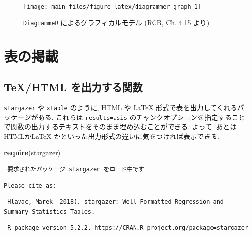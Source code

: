 \documentclass[
  nomag]{bxjsbook}
\newenvironment{Shaded}{\begin{snugshade}}{\end{snugshade}}
\newcommand{\KeywordTok}[1]{\textcolor[rgb]{0.13,0.29,0.53}{\textbf{#1}}}
\newcommand{\NormalTok}[1]{#1}
\theoremstyle{definition}
\theoremstyle{definition}
\theoremstyle{definition}
\theoremstyle{remark}
\begin{document}
\begin{figure}

{\centering \texttt{[image: main\_files/figure-latex/diagrammer-graph-1]} 

}

\caption{\texttt{DiagrammeR} によるグラフィカルモデル (RCB,
Ch. 4.15 より)}\label{fig:diagrammer-graph}
\end{figure}

\hypertarget{ux8868ux306eux63b2ux8f09}{%
\chapter{表の掲載}\label{ux8868ux306eux63b2ux8f09}}

\hypertarget{texhtml-ux3092ux51faux529bux3059ux308bux95a2ux6570}{%
\section{TeX/HTML
を出力する関数}\label{texhtml-ux3092ux51faux529bux3059ux308bux95a2ux6570}}

\texttt{stargazer} や \texttt{xtable} のように, HTML や \LaTeX
形式で表を出力してくれるパッケージがある. これらは
\texttt{results=\textquotesingle{}asis\textquotesingle{}}
のチャンクオプションを指定することで関数の出力するテキストをそのまま埋め込むことができる.
よって, あとは HTMLか\LaTeX
かといった出力形式の違いに気をつければ表示できる.



\begin{Shaded}
\begin{Highlighting}[numbers=left,,]
\KeywordTok{require}\NormalTok{(stargazer)}
\end{Highlighting}
\end{Shaded}

\begin{verbatim}
 要求されたパッケージ stargazer をロード中です 
\end{verbatim}

\begin{verbatim}
Please cite as: 
\end{verbatim}

\begin{verbatim}
 Hlavac, Marek (2018). stargazer: Well-Formatted Regression and Summary Statistics Tables.
\end{verbatim}

\begin{verbatim}
 R package version 5.2.2. https://CRAN.R-project.org/package=stargazer 
\end{verbatim}
\end{document}
